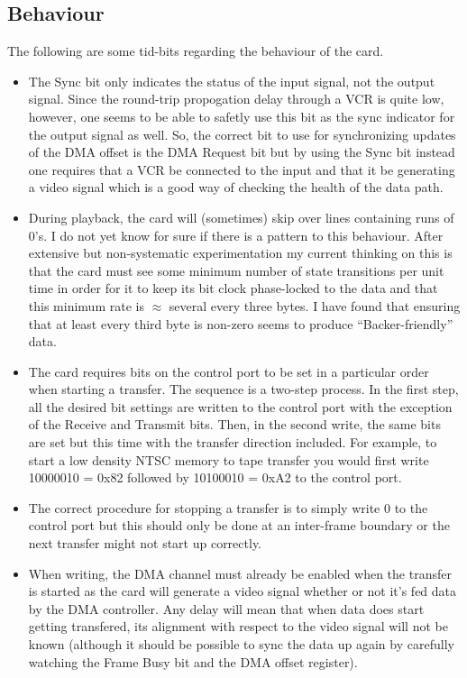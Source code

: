 \documentclass{article}
\begin{document}
\subsection{Behaviour}

The following are some tid-bits regarding the behaviour of the card.
\begin{itemize}
\item
The Sync bit only indicates the status of the input signal, not the output
signal.  Since the round-trip propogation delay through a VCR is quite low,
however, one seems to be able to safetly use this bit as the sync indicator
for the output signal as well.  So, the correct bit to use for
synchronizing updates of the DMA offset is the DMA Request bit but by using
the Sync bit instead one requires that a VCR be connected to the input and
that it be generating a video signal which is a good way of checking the
health of the data path.

\item
During playback, the card will (sometimes) skip over lines containing runs
of 0's.  I do not yet know for sure if there is a pattern to this
behaviour.  After extensive but non-systematic experimentation my current
thinking on this is that the card must see some minimum number of state
transitions per unit time in order for it to keep its bit clock
phase-locked to the data and that this minimum rate is \(\approx\) several
every three bytes.  I have found that ensuring that at least every third
byte is non-zero seems to produce ``Backer-friendly'' data.

\item
The card requires bits on the control port to be set in a particular order
when starting a transfer.  The sequence is a two-step process.  In the
first step, all the desired bit settings are written to the control port
with the exception of the Receive and Transmit bits.  Then, in the second
write, the same bits are set but this time with the transfer direction
included.  For example, to start a low density NTSC memory to tape transfer
you would first write 10000010 = 0x82 followed by 10100010 = 0xA2 to the
control port.

\item
The correct procedure for stopping a transfer is to simply write 0 to the
control port but this should only be done at an inter-frame boundary or the
next transfer might not start up correctly.

\item
When writing, the DMA channel must already be enabled when the transfer is
started as the card will generate a video signal whether or not it's fed
data by the DMA controller.  Any delay will mean that when data does start
getting transfered, its alignment with respect to the video signal will not
be known (although it should be possible to sync the data up again by
carefully watching the Frame Busy bit and the DMA offset register).
\end{itemize}
\end{document}
